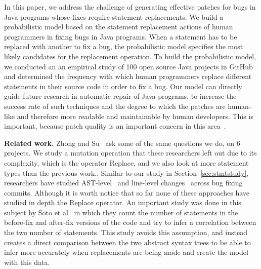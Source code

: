 In this paper, we address the challenge of generating effective patches for bugs in Java programs whose fixes require statement replacements. We build a probabilistic model based on the statement replacement actions of human programmers in fixing bugs in Java programs. When a statement has to be replaced with another to fix a bug, the probabilistic model specifies the most likely candidates for the replacement operation. To build the probabilistic model, we conducted an an empirical study of 100 open source Java projects in GitHub and determined the frequency with which human programmers replace different statements in their source code in order to fix a bug. Our model can directly guide future research in automatic repair of Java programs, to increase the success rate of such techniques and the degree to which the patches are human-like and therefore more readable and maintainable by human developers. This is important, because patch quality is an important
concern in this area~\cite{Qi15}.


\vspace{1ex} \noindent\textbf{Related work.} Zhong and Su~\cite{zhong2015} ask
some of the same questions we do, on 6 projects. We study a mutation operation that these researchers left out due to its complexity, which is the operator Replace, and we also look at more statement types than the previous work.. Similar to our study in
Section~\ref{sec:stmtstudy}, researchers have 
studied AST-level~\cite{Martinez:2015ez} and line-level
changes~\cite{Asaduzzaman:2013df} across bug fixing commits.
Although it is worth notice that so far none of these approaches have studied in depth the Replace operator.
An important study was done in this subject by Soto et al~\cite{soto} in which they count the number of statements in the before-fix and after-fix versions of the code and try to infer a correlation between the two number of statements. This study avoids this assumption, and instead creates a direct comparison between the two abstract syntax trees to be able to infer more accurately when replacements are being made and create the model with this data.
